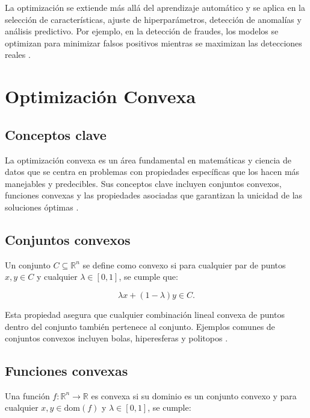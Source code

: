 La optimización se extiende más allá del aprendizaje automático y se aplica en la selección de características, ajuste de hiperparámetros, detección de anomalías y análisis predictivo. Por ejemplo, en la detección de fraudes, los modelos se optimizan para minimizar falsos positivos mientras se maximizan las detecciones reales \cite{ng2004feature}.


\section{Optimización Convexa}

\subsection{Conceptos clave}

La optimización convexa es un área fundamental en matemáticas y ciencia de datos que se centra en problemas con propiedades específicas que los hacen más manejables y predecibles. Sus conceptos clave incluyen conjuntos convexos, funciones convexas y las propiedades asociadas que garantizan la unicidad de las soluciones óptimas \cite{boyd2004convex}.

\subsection{Conjuntos convexos}

Un conjunto \(C \subseteq \mathbb{R}^n\) se define como convexo si para cualquier par de puntos \(x, y \in C\) y cualquier \(\lambda \in [0,1]\), se cumple que:

\begin{equation}
	\lambda x + (1 - \lambda)y \in C.
\end{equation}

Esta propiedad asegura que cualquier combinación lineal convexa de puntos dentro del conjunto también pertenece al conjunto. Ejemplos comunes de conjuntos convexos incluyen bolas, hiperesferas y politopos \cite{boyd2004convex}.

\subsection{Funciones convexas}

Una función \(f: \mathbb{R}^n \to \mathbb{R}\) es convexa si su dominio es un conjunto convexo y para cualquier \(x, y \in \text{dom}(f)\) y \(\lambda \in [0,1]\), se cumple:

